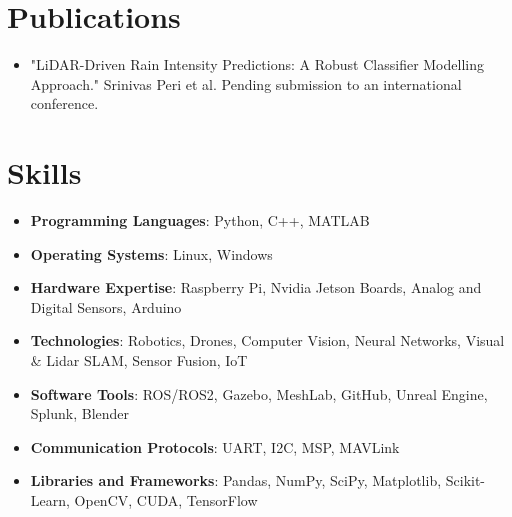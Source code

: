 \documentclass[a4paper,10pt]{article}
\begin{document}
\section*{Publications}
\begin{itemize}
    \item "LiDAR-Driven Rain Intensity Predictions: A Robust Classifier Modelling Approach." Srinivas Peri et al. Pending submission to an international conference.
\end{itemize}

\section*{Skills}
{\fontsize{10pt}{10pt}\selectfont  %
\begin{itemize}
    \item \textbf{Programming Languages}: Python, C++, MATLAB
    \item \textbf{Operating Systems}: Linux, Windows
    \item \textbf{Hardware Expertise}: Raspberry Pi, Nvidia Jetson Boards, Analog and Digital Sensors, Arduino
    \item \textbf{Technologies}: Robotics, Drones, Computer Vision, Neural Networks, Visual \& Lidar SLAM, Sensor Fusion, IoT
    \item \textbf{Software Tools}: ROS/ROS2, Gazebo, MeshLab, GitHub, Unreal Engine, Splunk, Blender
    \item \textbf{Communication Protocols}: UART, I2C, MSP, MAVLink 
    \item \textbf{Libraries and Frameworks}: Pandas, NumPy, SciPy, Matplotlib, Scikit-Learn, OpenCV, CUDA, TensorFlow
\end{itemize}
}  %
\end{document}
